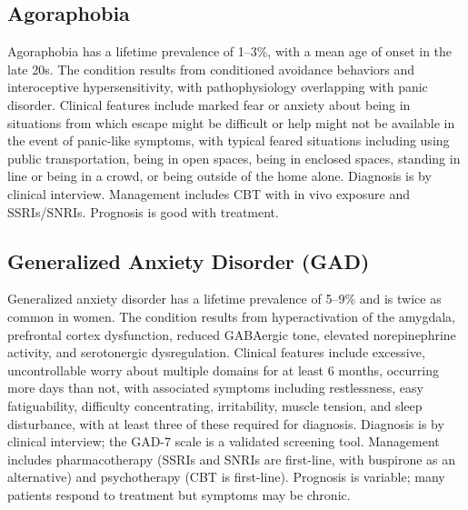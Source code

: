 \subsection{Agoraphobia}
\label{sec:Agoraphobia}
Agoraphobia has a lifetime prevalence of 1--3\%, with a mean age of onset in the late 20s. The condition results from conditioned avoidance behaviors and interoceptive hypersensitivity, with pathophysiology overlapping with panic disorder. Clinical features include marked fear or anxiety about being in situations from which escape might be difficult or help might not be available in the event of panic-like symptoms, with typical feared situations including using public transportation, being in open spaces, being in enclosed spaces, standing in line or being in a crowd, or being outside of the home alone. Diagnosis is by clinical interview. Management includes CBT with in vivo exposure and SSRIs/SNRIs. Prognosis is good with treatment.

\subsection{Generalized Anxiety Disorder (GAD)}
\label{sec:Generalized Anxiety Disorder (GAD)}
Generalized anxiety disorder has a lifetime prevalence of 5--9\% and is twice as common in women. The condition results from hyperactivation of the amygdala, prefrontal cortex dysfunction, reduced GABAergic tone, elevated norepinephrine activity, and serotonergic dysregulation. Clinical features include excessive, uncontrollable worry about multiple domains for at least 6 months, occurring more days than not, with associated symptoms including restlessness, easy fatiguability, difficulty concentrating, irritability, muscle tension, and sleep disturbance, with at least three of these required for diagnosis. Diagnosis is by clinical interview; the GAD-7 scale is a validated screening tool. Management includes pharmacotherapy (SSRIs and SNRIs are first-line, with buspirone as an alternative) and psychotherapy (CBT is first-line). Prognosis is variable; many patients respond to treatment but symptoms may be chronic.

